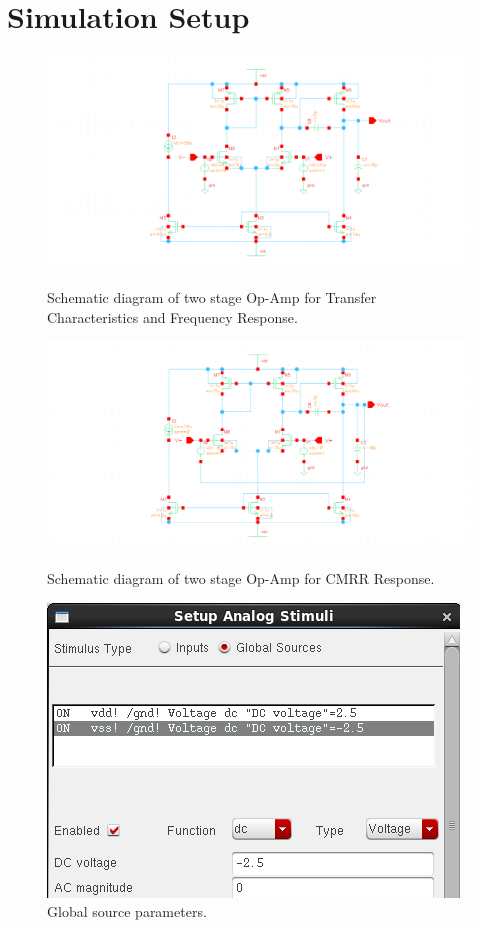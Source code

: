 \documentclass[11pt]{article}
\begin{document}
\section{Simulation Setup}
\begin{figure}[!h]
    \centering
    \includegraphics[width=\textwidth]{schematic.png}
    \caption{Schematic diagram of two stage Op-Amp for Transfer Characteristics and Frequency Response.}
    \includegraphics[width=\textwidth]{schematicCMRR.png}
    \caption{Schematic diagram of two stage Op-Amp for CMRR Response.}
    \includegraphics[scale=0.4]{global.png}
    \caption{Global source parameters.}
\end{figure}
\newpage
\end{document}
